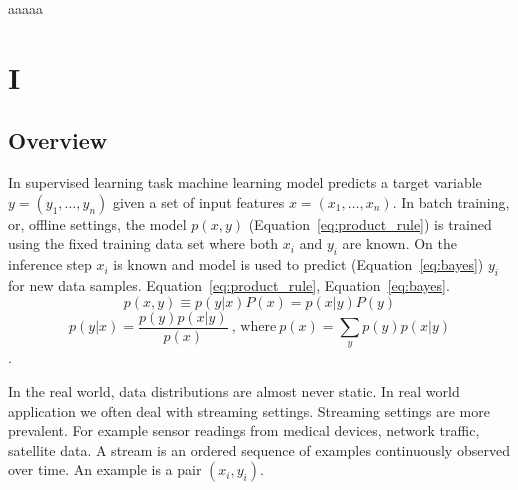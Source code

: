 \documentclass[doctoral,utf8,lot,loar,lof,shortloft,index]{jydiss}
\begin{document}
\preface

 aaaaa

\acknowledgements

\begin{notations}
\end{notations}

\mainmatter
\chapter{I}
\section{Overview}
In supervised learning task machine learning model predicts a target variable $y = (y_1, \dots, y_n)$ given a set of input features $x = (x_1, \dots, x_n)$.
In batch training, or, offline settings, the model $p(x, y)$ (Equation~\ref{eq:product_rule}) is trained using the fixed training data set where both $x_i$ and $y_i$ are known.  On the inference step $x_i$ is known and model is used to predict (Equation~\ref{eq:bayes}) $y_i$ for new data samples. 
Equation~\ref{eq:product_rule}, Equation~\ref{eq:bayes}.
\begin{equation}\label{eq:product_rule}
  p(x,y) \equiv p(y|x)P(x) = p(x|y)P(y)
\end{equation}
\begin{equation}\label{eq:bayes}
  p(y | x) = \frac{p(y) p(x|y)}{p(x)}\: \text{, where}\: p(x)=\sum_{y} p(y) p(x|y)
\end{equation}.

In the real world, data distributions are almost never static. 
In real world application we often deal with streaming settings.
Streaming settings are more prevalent.
For example sensor readings from medical devices, network traffic, satellite data.
A stream is an ordered sequence of examples continuously observed over time. 
An example is a pair $(x_i, y_i)$.
\end{document}
